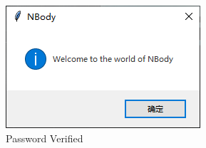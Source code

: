 \documentclass[]{report}
\begin{document}
\begin{figure}[h]
\begin{minipage}{40em}
\begin{minipage}{18em}
				\end{minipage}
				\quad
				\begin{minipage}{18em}
					\centering
					\includegraphics[scale=0.7]{pics/Verifyed.PNG}
					\caption{Password Verified}
				\end{minipage}
			\end{minipage}
		\end{figure}
\end{document}

